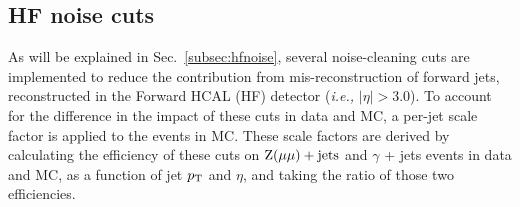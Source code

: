 



\subsection{HF noise cuts}
\label{subsec:hf_weighting}

As will be explained in Sec.~\ref{subsec:hfnoise}, several noise-cleaning cuts are implemented to reduce the contribution 
from mis-reconstruction of forward jets,
reconstructed in the Forward HCAL (HF) detector (\textit{i.e.,} $|\eta| > 3.0$). To account for the difference in the impact of these cuts in
data and MC, a per-jet scale factor is applied to the events in MC. These scale factors are derived by calculating the efficiency 
of these cuts on $\mathrm{Z}(\mu\mu)+\textrm{jets}$ and $\gamma$ + jets events in data and MC, as a function of jet $p_{\textrm{T}}$ and $\eta$, and taking 
the ratio of those two efficiencies. 

